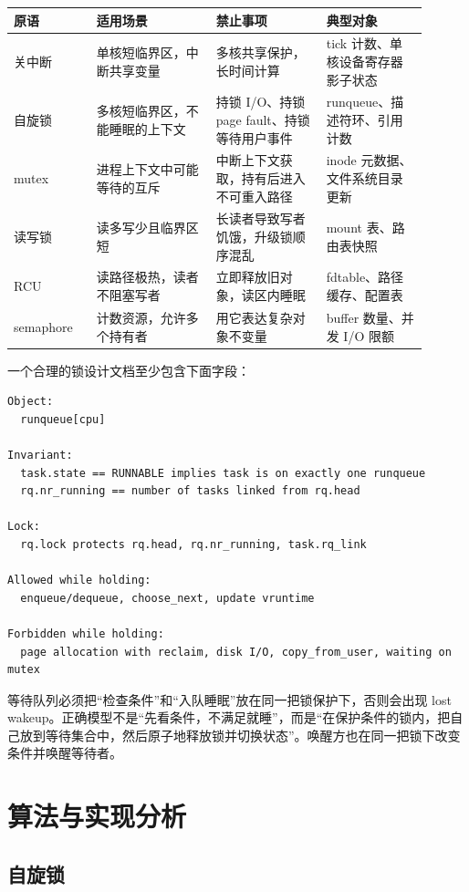 \begin{longtable}{|p{0.18\linewidth}|p{0.26\linewidth}|p{0.24\linewidth}|p{0.22\linewidth}|}
\toprule
原语 & 适用场景 & 禁止事项 & 典型对象 \\
\midrule
关中断 & 单核短临界区，中断共享变量 & 多核共享保护，长时间计算 & tick 计数、单核设备寄存器影子状态 \\\tablerowrule
自旋锁 & 多核短临界区，不能睡眠的上下文 & 持锁 I/O、持锁 page fault、持锁等待用户事件 & runqueue、描述符环、引用计数 \\\tablerowrule
mutex & 进程上下文中可能等待的互斥 & 中断上下文获取，持有后进入不可重入路径 & inode 元数据、文件系统目录更新 \\\tablerowrule
读写锁 & 读多写少且临界区短 & 长读者导致写者饥饿，升级锁顺序混乱 & mount 表、路由表快照 \\\tablerowrule
RCU & 读路径极热，读者不阻塞写者 & 立即释放旧对象，读区内睡眠 & fdtable、路径缓存、配置表 \\\tablerowrule
semaphore & 计数资源，允许多个持有者 & 用它表达复杂对象不变量 & buffer 数量、并发 I/O 限额 \\
\bottomrule
\end{longtable}

一个合理的锁设计文档至少包含下面字段：

\begin{lstlisting}
Object:
  runqueue[cpu]

Invariant:
  task.state == RUNNABLE implies task is on exactly one runqueue
  rq.nr_running == number of tasks linked from rq.head

Lock:
  rq.lock protects rq.head, rq.nr_running, task.rq_link

Allowed while holding:
  enqueue/dequeue, choose_next, update vruntime

Forbidden while holding:
  page allocation with reclaim, disk I/O, copy_from_user, waiting on mutex
\end{lstlisting}

等待队列必须把“检查条件”和“入队睡眠”放在同一把锁保护下，否则会出现 lost wakeup。正确模型不是“先看条件，不满足就睡”，而是“在保护条件的锁内，把自己放到等待集合中，然后原子地释放锁并切换状态”。唤醒方也在同一把锁下改变条件并唤醒等待者。

\section{算法与实现分析}

\subsection{自旋锁}

